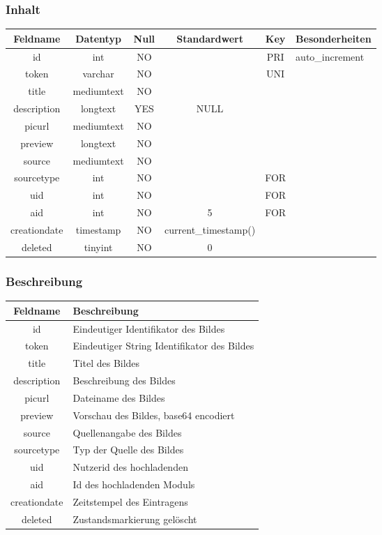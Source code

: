 \subsubsection{Inhalt}
\begin{table}[H]
	\begin{tabular}{|c|c|c|c|c|p{3.5cm}|}
		\hline
		\textbf{Feldname} & \textbf{Datentyp} & \textbf{Null} & \textbf{Standardwert} & \textbf{Key}   & \textbf{Besonderheiten} \\ \hline
		id & int & NO &  & PRI & auto\_increment \\ \hline
		token & varchar & NO &  & UNI & \\ \hline
		title & mediumtext & NO &  &  & \\ \hline
		description & longtext & YES & NULL &  & \\ \hline
		picurl & mediumtext & NO &  &  & \\ \hline
		preview & longtext & NO &  &  & \\ \hline
		source & mediumtext & NO &  &  & \\ \hline
		sourcetype & int & NO &  & FOR & \\ \hline
		uid & int & NO &  & FOR & \\ \hline
		aid & int & NO & 5 & FOR & \\ \hline
		creationdate & timestamp & NO & current\_timestamp() &  & \\ \hline
		deleted & tinyint & NO & 0 &  & \\ \hline
	\end{tabular}
\end{table}
\subsubsection{Beschreibung}
\begin{table}[H]
	\begin{tabular}{|c|p{12cm}|}
		\hline
		\textbf{Feldname} & \textbf{Beschreibung} \\ \hline
		id & Eindeutiger Identifikator des Bildes \\ \hline
		token & Eindeutiger String Identifikator des Bildes \\ \hline
		title & Titel des Bildes \\ \hline
		description & Beschreibung des Bildes \\ \hline
		picurl & Dateiname des Bildes \\ \hline
		preview & Vorschau des Bildes, base64 encodiert \\ \hline
		source & Quellenangabe des Bildes \\ \hline
		sourcetype & Typ der Quelle des Bildes \\ \hline
		uid & Nutzerid des hochladenden \\ \hline
		aid & Id des hochladenden Moduls \\ \hline
		creationdate & Zeitstempel des Eintragens \\ \hline
		deleted & Zustandsmarkierung {\glqq gelöscht\grqq} \\ \hline
	\end{tabular}
\end{table}
